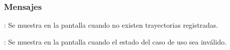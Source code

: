\subsubsection{Mensajes}

\begin{Citemize}
	\item {}: Se muestra en la pantalla  cuando no existen trayectorias registradas.
	\item {}: Se muestra en la pantalla  cuando el estado del caso de uso sea inválido.
\end{Citemize}
